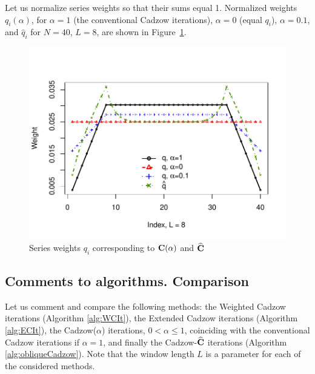 \documentclass[sii]{ipart}
\begin{document}
Let us normalize series weights so that their sums equal 1.
Normalized weights $q_i(\alpha)$, for $\alpha = 1$ (the conventional Cadzow iterations), $\alpha = 0$ (equal $q_i$), $\alpha = 0.1$,
and $\hat{q}_i$ for $N = 40$, $L = 8$, are shown in Figure~\ref{img_weights}.
\begin{figure}
		\includegraphics[width =\columnwidth]{weights.pdf}\caption{Series weights $q_i$ corresponding to $\mathbf{C}(\alpha)$ and $\widehat{\mathbf{C}}$}\label{img_weights}
\end{figure}
	
	\subsection{Comments to algorithms. Comparison}
\label{sec:comments}
	
	Let us comment and compare the following methods: the Weighted Cadzow iterations (Algorithm \ref{alg:WCIt}), the Extended Cadzow iterations (Algorithm \ref{alg:ECIt}), the Cadzow($\alpha$) iterations, $0< \alpha \leq 1$, coinciding with the conventional Cadzow iterations if $\alpha=1$,
	and finally the Cadzow-$\widehat{\mathbf{C}}$ iterations (Algorithm \ref{alg:obliqueCadzow}).
	Note that the window length $L$ is a parameter for each of the considered methods.
	
\end{document}
